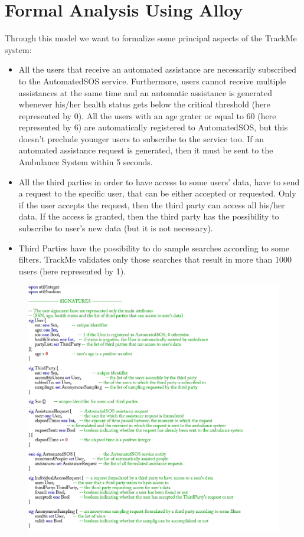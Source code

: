 \documentclass[12pt,a4paper]{article}
\begin{document}
	\section{Formal Analysis Using Alloy}
	Through this model we want to formalize some principal aspects of the TrackMe system:
	\begin{itemize}
		\item All the users that receive an automated assistance are necessarily subscribed to the AutomatedSOS service. 
		Furthermore, users cannot receive multiple assistances at the same time and an automatic assistance is generated 
		whenever his/her health status gets below the critical threshold (here represented by 0). All the users with an age grater or equal to 60 (here represented by 6) are automatically registered to AutomatedSOS, but this doesn't preclude younger users to subscribe to the service too. If an automated assistance request is generated, then it must be sent to the Ambulance System within 5 seconds.
		\item All the third parties in order to have access to some users' data, have to send a request to the specific user, that can be either accepted or requested. Only if the user accepts the request, then the third party can access all his/her data. If the access is granted, then the third party has the possibility to subscribe to user's new data (but it is not necessary).
		\item Third Parties have the possibility to do sample searches according to some filters. TrackMe validates only those searches that result in more than 1000 users (here represented by 1). 
	\end{itemize}
	\begin{figure}[H]
		\centering
		\includegraphics[width=1.4\linewidth]{Images/signatures}
		\label{fig:signatures}
	\end{figure}
\end{document}
